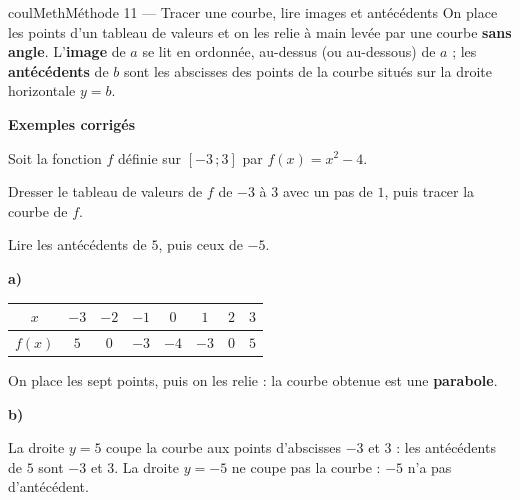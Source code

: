 \documentclass[11pt,a4paper]{article}
\makeatletter
\newcommand{\lycee@repere}[4]{%
  \draw[grille,step=1] (#1,#2) grid (#3,#4);
  \draw[-{Stealth[length=2mm]},thick] (#1,0)--({#3+0.4},0) node[below left=-1pt]{$x$};
  \draw[-{Stealth[length=2mm]},thick] (0,#2)--(0,{#4+0.4}) node[below left=-1pt]{$y$};
  \node[below left,font=\scriptsize,inner sep=1.5pt] at (0,0) {$0$};}
\newcommand{\lycee@gradx}[1]{\foreach \k/\l in {#1}{%
  \draw (\k,0.07)--(\k,-0.07) node[below,font=\scriptsize,inner sep=1.5pt]{$\l$};}}
\newcommand{\lycee@grady}[1]{\foreach \k/\l in {#1}{%
  \draw (0.07,\k)--(-0.07,\k) node[left,font=\scriptsize,inner sep=1.5pt]{$\l$};}}
\newcommand{\lycee@intff}[2]{\left[#1\,;#2\right]}
\providecommand{\repere}{\lycee@repere}%
\providecommand{\gradx}{\lycee@gradx}%
\providecommand{\grady}{\lycee@grady}%
\providecommand{\Cf}{\mathcal{C}\sb{f}}%
\providecommand{\intff}{\lycee@intff}%
\newcounter{lycee@signet}
\newcommand{\signet}[3][]{\stepcounter{lycee@signet}%
  \edef\lycee@dest{\if\relax\detokenize{#1}\relax
    signet.\arabic{lycee@signet}\else#1\fi}%
  \hypertarget{\lycee@dest}{}\bookmark[level=#2,dest=\lycee@dest]{#3}}
\newcommand{\res}[1]{#1}
\newcounter{methode}
\newenvironment{methodebox}[1][Méthode]{\stepcounter{methode}%
  \begin{boitecours}[phantom={\signet[methode-\arabic{methode}]{2}{#1}}]{coulMeth}{#1}}%
  {\end{boitecours}}
\newcommand{\etape}[1]{\par\smallskip\textbf{\color{coulMeth}#1}\par\nobreak\smallskip}
\newcommand{\cas}[1]{\par\smallskip\noindent\textbf{\color{coulExo}#1}\vadjust{\nobreak}}
\newenvironment{correction}{\par}{\par}
\newcommand{\etapeexemples}{\etape{Exemples corrigés}}
\makeatother
\begin{document}
\begin{methodebox}[Méthode 11 --- Tracer une courbe, lire images et antécédents]
On place les points d'un tableau de valeurs et on les relie à main levée par une courbe
\textbf{sans angle}. L'\textbf{image} de $a$ se lit en ordonnée, au-dessus (ou
au-dessous) de $a$ ; les \textbf{antécédents} de $b$ sont les abscisses des points de la
courbe situés sur la droite horizontale $y=b$.
\etapeexemples
Soit la fonction $f$ définie sur $\intff{-3}{3}$ par ${f(x)=x^{2}-4}$.
\begin{questions}[label=\alph*)]
  \item Dresser le tableau de valeurs de $f$ de $-3$ à $3$ avec un pas de $1$, puis
        tracer la courbe de $f$.
  \item Lire les antécédents de $5$, puis ceux de $-5$.
\end{questions}
\begin{correction}
\begin{minipage}[t]{0.58\linewidth}\raggedright
\cas{a)}\par\nopagebreak
\begin{center}
\renewcommand{\arraystretch}{1.25}
\begin{tabular}{|c|*{7}{c|}}
\hline
$x$ & $-3$ & $-2$ & $-1$ & $0$ & $1$ & $2$ & $3$\\\hline
$f(x)$ & $5$ & $0$ & $-3$ & $-4$ & $-3$ & $0$ & $5$\\\hline
\end{tabular}
\end{center}
On place les sept points, puis on les relie : la courbe obtenue est une
\textbf{parabole}.

\cas{b)}\par\nopagebreak
La droite $y=5$ coupe la courbe aux points d'abscisses $-3$ et $3$ : les antécédents
de $5$ sont \res{${-3}$ et ${3}$}. La droite $y=-5$ ne coupe pas la courbe : \res{$-5$ n'a pas
d'antécédent}.
\end{minipage}\hfill
\begin{minipage}[t]{0.38\linewidth}
\vspace{0pt}\centering
{}
\end{minipage}
\end{correction}


\end{methodebox}
\end{document}
